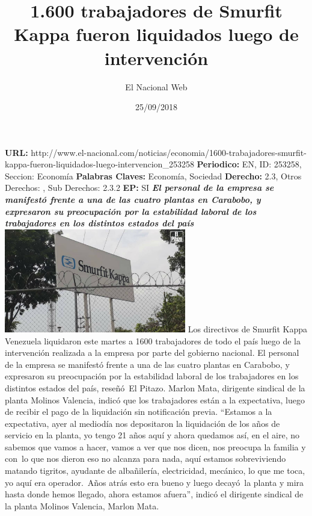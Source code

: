 \documentclass{article}%
\title{\textbf{1.600 trabajadores de Smurfit Kappa fueron liquidados luego de intervención}}%
\author{El Nacional Web}%
\date{25/09/2018}%
\begin{document}
%
\normalsize%
\maketitle%
\textbf{URL: }%
http://www.el{-}nacional.com/noticias/economia/1600{-}trabajadores{-}smurfit{-}kappa{-}fueron{-}liquidados{-}luego{-}intervencion\_253258\newline%
%
\textbf{Periodico: }%
EN, %
ID: %
253258, %
Seccion: %
Economía\newline%
%
\textbf{Palabras Claves: }%
Economía, Sociedad\newline%
%
\textbf{Derecho: }%
2.3, %
Otros Derechos: %
, %
Sub Derechos: %
2.3.2\newline%
%
\textbf{EP: }%
SI\newline%
\newline%
%
\textbf{\textit{El personal de la empresa se manifestó frente a una de las cuatro plantas en Carabobo, y expresaron su preocupación por la estabilidad laboral de los trabajadores en los distintos estados del país}}%
\newline%
\newline%
%
\includegraphics[width=300px]{238.jpg}%
\newline%
%
Los directivos de Smurfit Kappa Venezuela liquidaron este martes a 1600 trabajadores de todo el país luego de la intervención realizada a la empresa por parte del gobierno nacional.%
\newline%
%
El personal de la empresa se manifestó frente a una de las cuatro plantas en Carabobo, y expresaron su preocupación por la estabilidad laboral de los trabajadores en los distintos estados del país, reseñó~El Pitazo.%
\newline%
%
Marlon Mata, dirigente sindical de la planta Molinos Valencia, indicó que los trabajadores están a la expectativa, luego de recibir el pago de la liquidación sin notificación previa.%
\newline%
%
“Estamos a la expectativa, ayer al mediodía nos depositaron la liquidación de los años de servicio en la planta, yo tengo 21 años aquí y ahora quedamos así, en el aire, no sabemos que vamos a hacer, vamos a ver que nos dicen, nos preocupa la familia y con~lo que nos dieron eso no alcanza para nada, aquí estamos sobreviviendo matando tigritos, ayudante de albañilería, electricidad, mecánico, lo que me toca, yo aquí era operador.~Años atrás esto era bueno y luego decayó~la planta y mira hasta donde hemos llegado, ahora estamos afuera”, indicó el dirigente sindical de la planta Molinos Valencia, Marlon Mata.%
\end{document}
